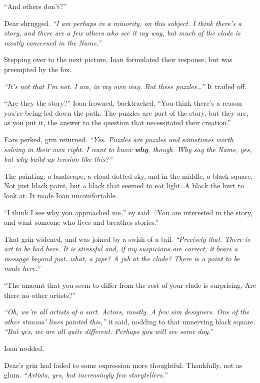 ``And others don't?''

Dear shrugged. \emph{``I am perhaps in a minority, on this subject. I think there's a story, and there are a few others who see it my way, but much of the clade is mostly concerned in the Name.''}

Stepping over to the next picture, Ioan formulated their response, but was preempted by the fox.

\emph{``It's not that I'm not. I am, in my own way. But these puzzles\ldots{}''} It trailed off.

``Are they the story?'' Ioan frowned, backtracked. ``You think there's a reason you're being led down the path. The puzzles are part of the story, but they are, as you put it, the answer to the question that necessitated their creation.''

Ears perked, grin returned. \emph{``Yes. Puzzles are puzzles and sometimes worth solving in their own right. I want to know \textbf{why}, though. Why say the Name, yes, but why build up tension like this?''}

The painting: a landscape, a cloud-dotted sky, and in the middle, a black square. Not just black paint, but a black that seemed to eat light. A black the hurt to look at. It made Ioan uncomfortable.

``I think I see why you approached me,'' ey said. ``You are interested in the story, and want someone who lives and breathes stories.''

That grin widened, and was joined by a swish of a tail. \emph{``Precisely that. There is art to be had here. It is stressful and, if my suspicions are correct, it bears a message beyond just\ldots{}what, a jape? A jab at the clade? There is a point to be made here.''}

``The amount that you seem to differ from the rest of your clade is surprising. Are there no other artists?''

\emph{``Oh, we're all artists of a sort. Actors, mostly. A few sim designers. One of the other stanzas' lines painted this,''} it said, nodding to that unnerving black square. \emph{``But yes, we are all quite different. Perhaps you will see some day.''}

Ioan nodded.

Dear's grin had faded to some expression more thoughtful. Thankfully, not as glum. \emph{``Artists, yes, but increasingly few storytellers.''}
